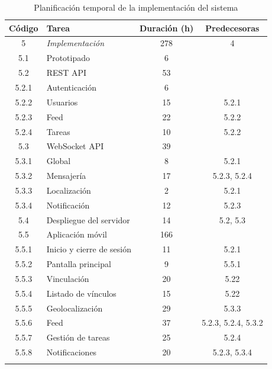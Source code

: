 \begin{longtable}{ c p{} c c }
    \hline
    Código & Tarea & Duración (h) & Predecesoras \\
    \hline
    5 & \emph{Implementación} & 278 & 4 \\
    5.1 & Prototipado & 6 &  \\
    5.2 & REST API & 53 & \\
    5.2.1 & \hspace{3mm}Autenticación & 6 & \\
    5.2.2 & \hspace{3mm}Usuarios & 15 & 5.2.1 \\
    5.2.3 & \hspace{3mm}Feed & 22 & 5.2.2 \\
    5.2.4 & \hspace{3mm}Tareas & 10 & 5.2.2 \\
    5.3 & WebSocket API & 39 & \\
    5.3.1 & \hspace{3mm}Global & 8 & 5.2.1 \\
    5.3.2 & \hspace{3mm}Mensajería & 17 & 5.2.3, 5.2.4 \\
    5.3.3 & \hspace{3mm}Localización & 2 & 5.2.1 \\
    5.3.4 & \hspace{3mm}Notificación & 12 & 5.2.3 \\
    5.4 & Despliegue del servidor & 14 & 5.2, 5.3 \\
    5.5 & Aplicación móvil & 166 &  \\
    5.5.1 & \hspace{3mm}Inicio y cierre de sesión & 11 & 5.2.1 \\
    5.5.2 & \hspace{3mm}Pantalla principal & 9 & 5.5.1 \\
    5.5.3 & \hspace{3mm}Vinculación & 20 & 5.22 \\
    5.5.4 & \hspace{3mm}Listado de vínculos & 15 & 5.22 \\
    5.5.5 & \hspace{3mm}Geolocalización & 29 & 5.3.3 \\
    5.5.6 & \hspace{3mm}Feed & 37 & 5.2.3, 5.2.4, 5.3.2 \\
    5.5.7 & \hspace{3mm}Gestión de tareas & 25 & 5.2.4 \\
    5.5.8 & \hspace{3mm}Notificaciones & 20 & 5.2.3, 5.3.4 \\
    \hline
    \caption{Planificación temporal de la implementación del sistema}
    \label{pt:implementacion}
\end{longtable}

